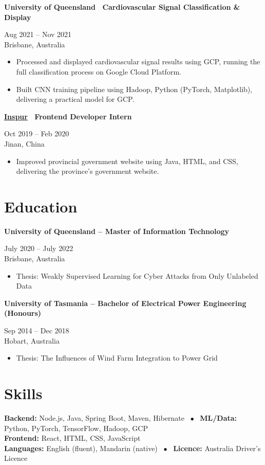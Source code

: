 \documentclass[10pt,a4paper]{article}
\newcommand{\itembullet}{\ $\bullet$\ }
\newcommand{\dateright}[2]{\hfill \parbox[t]{4.5cm}{\raggedleft\small #1 \\ \small #2}}
\newcommand{\entry}[3]{\noindent #1 \dateright{#2}{#3}\vspace{1pt}}
\begin{document}
\entry{\textbf{University of Queensland \textbar\ Cardiovascular Signal Classification \& Display}}{Aug 2021 -- Nov 2021}{Brisbane, Australia}
\begin{itemize}[leftmargin=1.5em, nosep, topsep=1pt]
  \item Processed and displayed cardiovascular signal results using GCP, running the full classification process on Google Cloud Platform.
  \item Built CNN training pipeline using Hadoop, Python (PyTorch, Matplotlib), delivering a practical model for GCP.
\end{itemize}
\vspace{0.12cm}

\entry{\textbf{\href{https://www.inspur.com}{Inspur} \textbar\ Frontend Developer Intern}}{Oct 2019 -- Feb 2020}{Jinan, China}
\begin{itemize}[leftmargin=1.5em, nosep, topsep=1pt]
  \item Improved provincial government website using Java, HTML, and CSS, delivering the province's government website.
\end{itemize}
\vspace{0.1cm}

\section*{Education}

\entry{\textbf{University of Queensland -- Master of Information Technology}}{July 2020 -- July 2022}{Brisbane, Australia}
\begin{itemize}[leftmargin=1.5em, nosep, topsep=1pt]
  \item Thesis: Weakly Supervised Learning for Cyber Attacks from Only Unlabeled Data
\end{itemize}
\vspace{0.1cm}

\entry{\textbf{University of Tasmania -- Bachelor of Electrical Power Engineering (Honours)}}{Sep 2014 -- Dec 2018}{Hobart, Australia}
\begin{itemize}[leftmargin=1.5em, nosep, topsep=1pt]
  \item Thesis: The Influences of Wind Farm Integration to Power Grid
\end{itemize}
\vspace{0.1cm}

\section*{Skills}
\textbf{Backend:} Node.js, Java, Spring Boot, Maven, Hibernate \itembullet
\textbf{ML/Data:} Python, PyTorch, TensorFlow, Hadoop, GCP \\
\textbf{Frontend:} React, HTML, CSS, JavaScript 
\\
\textbf{Languages:} English (fluent), Mandarin (native) \itembullet
\textbf{Licence:} Australia Driver's Licence

\end{document}
